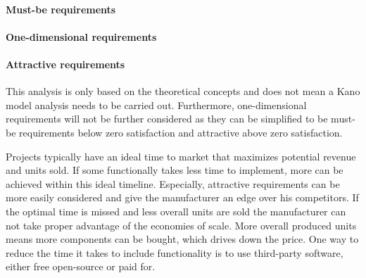 \paragraph{Must-be requirements}  \autocite{ElmarSauerwein.1996}

\paragraph{One-dimensional requirements} \autocite{ElmarSauerwein.1996}

\paragraph{Attractive requirements} \autocite{ElmarSauerwein.1996}

This analysis is only based on the theoretical concepts and does not mean a Kano model analysis needs to be carried out. Furthermore, one-dimensional requirements will not be further considered as they can be simplified to be must-be requirements below zero satisfaction and attractive above zero satisfaction. 

Projects typically have an ideal time to market \cite{clark1989project}\cite{stalk1988time} that maximizes potential revenue and units sold. If some functionally takes less time to implement, more can be achieved within this ideal timeline. Especially, attractive requirements can be more easily considered and give the manufacturer an edge over his competitors. If the optimal time is missed and less overall units are sold the manufacturer can not take proper advantage of the economies of scale. More overall produced units means more components can be bought, which drives down the price. One way to reduce the time it takes to include functionality is to use third-party software, either free open-source or paid for. 

